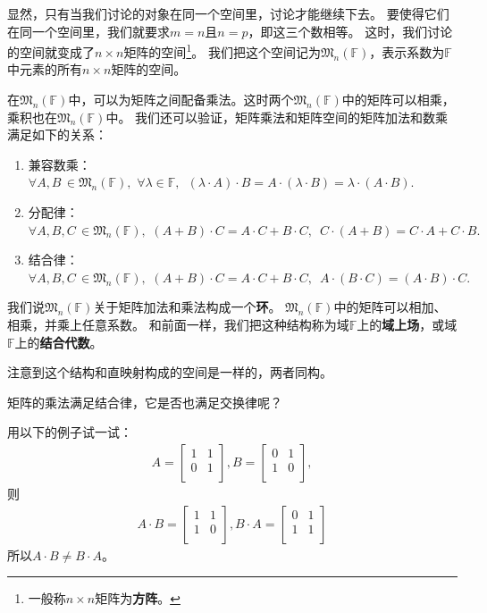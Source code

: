 \documentclass[12pt,UTF8,fontset=none]{ctexbook}
\begin{document}
显然，只有当我们讨论的对象在同一个空间里，讨论才能继续下去。
要使得它们在同一个空间里，我们就要求$m=n$且$n=p$，即这三个数相等。
这时，我们讨论的空间就变成了$n\times n$矩阵的空间\footnote{一般称$n\times n$矩阵为\textbf{方阵}。}。
我们把这个空间记为$\mathfrak{M}_n(\mathbb{F})$，表示系数为$\mathbb{F}$中元素的所有$n\times n$矩阵的空间。

在$\mathfrak{M}_n(\mathbb{F})$中，可以为矩阵之间配备乘法。这时两个$\mathfrak{M}_n(\mathbb{F})$中的矩阵可以相乘，乘积也在$\mathfrak{M}_n(\mathbb{F})$中。
我们还可以验证，矩阵乘法和矩阵空间的矩阵加法和数乘满足如下的关系：
\begin{enumerate}
    \item 兼容数乘：$\forall A,B \,\in \mathfrak{M}_n(\mathbb{F}), \,\, \forall \lambda\in\mathbb{F}, \,\,\, (\lambda\cdot A)\cdot B =  A \cdot (\lambda\cdot B) = \lambda\cdot (A\cdot B). $
    \item 分配律：$\forall A,B,C \,\in \mathfrak{M}_n(\mathbb{F}), \,\, (A + B)\cdot C = A\cdot C + B\cdot C,\,\,\, C\cdot (A + B) = C\cdot A + C\cdot B.$
    \item 结合律：$\forall A,B,C \,\in \mathfrak{M}_n(\mathbb{F}), \,\, (A + B)\cdot C = A\cdot C + B\cdot C,\,\,\, A\cdot(B\cdot C) = (A\cdot B)\cdot C.$
\end{enumerate}
我们说$\mathfrak{M}_n(\mathbb{F})$关于矩阵加法和乘法构成一个\textbf{环}。
$\mathfrak{M}_n(\mathbb{F})$中的矩阵可以相加、相乘，并乘上任意系数。
和前面一样，我们把这种结构称为域$\mathbb{F}$上的\textbf{域上场}，或域$\mathbb{F}$上的\textbf{结合代数}。

注意到这个结构和直映射构成的空间是一样的，两者同构。

矩阵的乘法满足结合律，它是否也满足交换律呢？

用以下的例子试一试：
\begin{align*}
    A = \begin{bmatrix}
        1     & 1  \\
        0     & 1 \\
    \end{bmatrix}, 
    B = \begin{bmatrix}
        0     & 1  \\
        1     & 0  \\
    \end{bmatrix}, 
\end{align*}
则
\begin{align*}
    A \cdot B = \begin{bmatrix}
        1     & 1  \\
        1     & 0 \\
    \end{bmatrix}, 
    B \cdot A = \begin{bmatrix}
        0     & 1  \\
        1     & 1  \\
    \end{bmatrix} 
\end{align*}
所以$A\cdot B \neq B \cdot A$。
\end{document}
